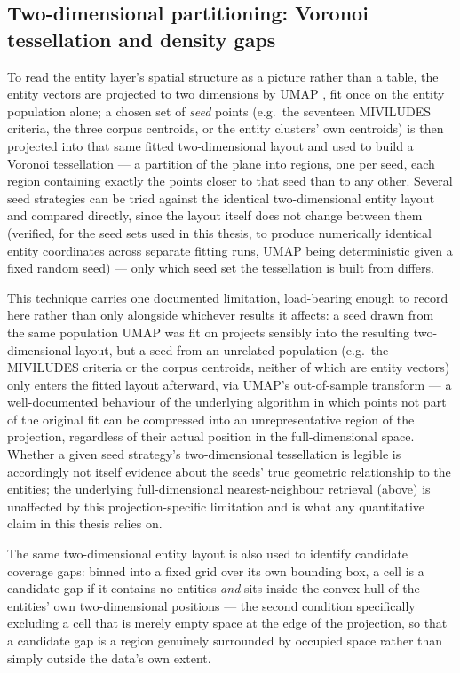 \subsection{Two-dimensional partitioning: Voronoi tessellation and density gaps}\label{sec:voronoi_methods}
To read the entity layer's spatial structure as a picture rather than a table, the entity vectors are projected to two dimensions by UMAP \autocite{mcinnesUMAPUniformManifold2020}, fit once on the entity population alone; a chosen set of \textit{seed} points (e.g.\ the seventeen MIVILUDES criteria, the three corpus centroids, or the entity clusters' own centroids) is then projected into that same fitted two-dimensional layout and used to build a Voronoi tessellation — a partition of the plane into regions, one per seed, each region containing exactly the points closer to that seed than to any other. Several seed strategies can be tried against the identical two-dimensional entity layout and compared directly, since the layout itself does not change between them (verified, for the seed sets used in this thesis, to produce numerically identical entity coordinates across separate fitting runs, UMAP being deterministic given a fixed random seed) — only which seed set the tessellation is built from differs.

This technique carries one documented limitation, load-bearing enough to record here rather than only alongside whichever results it affects: a seed drawn from the same population UMAP was fit on projects sensibly into the resulting two-dimensional layout, but a seed from an unrelated population (e.g.\ the MIVILUDES criteria or the corpus centroids, neither of which are entity vectors) only enters the fitted layout afterward, via UMAP's out-of-sample transform — a well-documented behaviour of the underlying algorithm in which points not part of the original fit can be compressed into an unrepresentative region of the projection, regardless of their actual position in the full-dimensional space. Whether a given seed strategy's two-dimensional tessellation is legible is accordingly not itself evidence about the seeds' true geometric relationship to the entities; the underlying full-dimensional nearest-neighbour retrieval (above) is unaffected by this projection-specific limitation and is what any quantitative claim in this thesis relies on.

The same two-dimensional entity layout is also used to identify candidate coverage gaps: binned into a fixed grid over its own bounding box, a cell is a candidate gap if it contains no entities \textit{and} sits inside the convex hull of the entities' own two-dimensional positions — the second condition specifically excluding a cell that is merely empty space at the edge of the projection, so that a candidate gap is a region genuinely surrounded by occupied space rather than simply outside the data's own extent.

